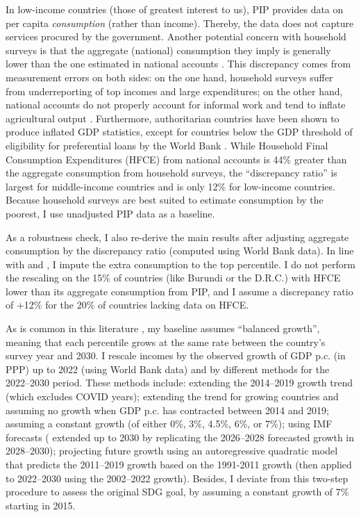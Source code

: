 \documentclass[12pt,english]{article}
\begin{document}
In low-income countries (those of greatest interest to us), PIP provides data on per capita \textit{consumption} (rather than income). Thereby, the data does not capture services procured by the government. Another potential concern with household surveys is that the aggregate (national) consumption they imply is generally lower than the one estimated in national accounts \citep{deaton_measuring_2005,prydz_disparities_2022,hlasny_impact_2022}. This discrepancy comes from measurement errors on both sides: on the one hand, household surveys suffer from underreporting of top incomes and large expenditures; on the other hand, national accounts do not properly account for informal work %
and tend to inflate agricultural output \citep{angrist_why_2021}. 
Furthermore, authoritarian countries have been shown to produce inflated GDP statistics, except for countries below the GDP threshold of eligibility for preferential loans by the World Bank \citep{martinez_how_2022}. %
While Household Final Consumption Expenditures (HFCE) from national accounts is 44\% greater than the aggregate consumption from household surveys, the ``discrepancy ratio'' is largest for middle-income countries and is only 12\% for low-income countries. 
Because household surveys are best suited to estimate consumption by the poorest, I use unadjusted PIP data as a baseline. 

As a robustness check, I also re-derive the main results after adjusting aggregate consumption by the discrepancy ratio (computed using World Bank data). In line with \cite{lakner_global_2013} and \cite{anand_chapter_2015}, I impute the extra consumption to the top percentile. I do not perform the rescaling on the 15\% of countries (like Burundi or the D.R.C.) with HFCE lower than its aggregate consumption from PIP, and I assume a discrepancy ratio of +12\% for the 20\% of countries lacking data on HFCE. 

As is common in this literature \citep{karver_mdgs_2012,hellebrandt_future_2015,bicaba_can_2017}, my baseline assumes ``balanced growth'', meaning that each percentile grows at the same rate between the country's survey year and 2030. 
I rescale incomes by the observed growth of GDP p.c. (in PPP) up to 2022 (using World Bank data) and by different methods for the 2022--2030 period. 
These methods include: extending the 2014--2019 growth trend (which excludes COVID years); extending the trend for growing countries and assuming no growth when GDP p.c. has contracted between 2014 and 2019; assuming a constant growth (of either 0\%, 3\%, 4.5\%, 6\%, or 7\%); using IMF forecasts (\cite{imf_world_2023} extended up to 2030 by replicating the 2026--2028 forecasted growth in 2028--2030); projecting future growth using an autoregressive quadratic model that predicts the 2011--2019 growth based on the 1991-2011 growth (then applied to 2022--2030 using the 2002--2022 growth). Besides, I deviate from this two-step procedure to assess the original SDG goal, by assuming a constant growth of 7\% starting in 2015.
\end{document}
